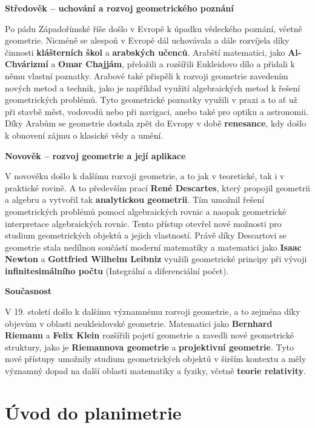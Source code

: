 \documentclass[12pt,a4paper]{article}
\begin{document}
\begin{historicalbox}
\bigskip
\textbf{Středověk – uchování a rozvoj geometrického poznání}

\smallskip
Po pádu Západořímské říše došlo v Evropě k úpadku vědeckého poznání, včetně geometrie.
Nicméně se alespoň v Evropě dál uchovávala a dále rozvíjela díky činnosti \textbf{klášterních škol}
a \textbf{arabských učenců}. Arabští matematici, jako \textbf{Al-Chvárizmí} a \textbf{Omar Chajjám},
přeložili a rozšířili Eukleidovo dílo a přidali k němu vlastní poznatky.
Arabové také přispěli k rozvoji geometrie zavedením nových metod a technik,
jako je například využití algebraických metod k řešení geometrických problémů.
Tyto geometrické poznatky využili v praxi a to ať už při stavbě měst, vodovodů nebo při navigaci, anebo
také pro optiku a astronomii. Díky Arabům se geometrie dostala zpět do Evropy
v době \textbf{renesance}, kdy došlo k obnovení zájmu o klasické vědy a umění.

\bigskip
\textbf{Novověk – rozvoj geometrie a její aplikace}

\smallskip
V novověku došlo k dalšímu rozvoji geometrie, a to jak v teoretické, tak i v praktické rovině.
A to především prací \textbf{René Descartes}, který propojil geometrii a algebru
a vytvořil tak \textbf{analytickou geometrii}. Tím umožnil řešení geometrických problémů pomocí algebraických rovnic
a naopak geometrické interpretace algebraických rovnic. Tento přístup otevřel nové možnosti pro studium geometrických objektů
a jejich vlastností. Právě díky Descartovi se geometrie stala nedílnou součástí moderní matematiky a
matematici jako \textbf{Isaac Newton} a \textbf{Gottfried Wilhelm Leibniz} využili geometrické principy
při vývoji \textbf{infinitesimálního počtu} (Integrální a diferenciální počet).

\bigskip
\textbf{Současnost}

\smallskip
V 19. století došlo k dalšímu významnému rozvoji geometrie, a to zejména díky objevům v oblasti neukleidovské geometrie.
Matematici jako \textbf{Bernhard Riemann} a \textbf{Felix Klein} rozšířili pojetí geometrie
a zavedli nové geometrické struktury, jako je \textbf{Riemannova geometrie} a \textbf{projektivní geometrie}.
Tyto nové přístupy umožnily studium geometrických objektů v širším kontextu a měly významný dopad na další oblasti matematiky
a fyziky, včetně \textbf{teorie relativity}.
\end{historicalbox}


\section{Úvod do planimetrie}
\end{document}
